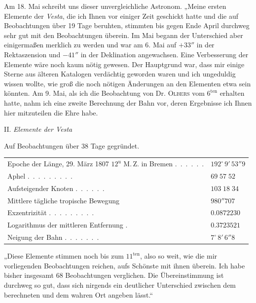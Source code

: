 \par\indent Am 18. Mai schreibt uns dieser unvergleichliche Astronom. „Meine ersten Elemente der \emph{Vesta}, die ich Ihnen vor einiger Zeit geschickt hatte und die auf Beobachtungen über 19 Tage beruhten, stimmten bis gegen Ende April durchweg sehr gut mit den Beobachtungen überein. Im Mai begann der Unterschied aber einigermaßen merklich zu werden und war am 6. Mai auf $+33''$ in der Rektaszension und $-41''$ in der Deklination angewachsen. Eine Verbesserung der Elemente wäre noch kaum nötig gewesen. Der Hauptgrund war, dass mir einige Sterne aus älteren Katalogen verdächtig geworden waren und ich ungeduldig wissen wollte, wie groß die noch nötigen Änderungen an den Elementen etwa sein könnten. Am 9. Mai, als ich die Beobachtung von Dr. \textsc{Olbers} vom $6^{\text{ten}}$ erhalten hatte, nahm ich eine zweite Berechnung der Bahn vor, deren Ergebnisse ich Ihnen hier mitzuteilen die Ehre habe.

\begin{center}
II. \emph{Elemente der Vesta}
\end{center}

\begin{center}
Auf Beobachtungen über 38 Tage gegründet.
\end{center}

\begin{center}\begingroup\fontsize{9}{11}\selectfont
\begin{tabular}{ll}
\shortstack[l]{Epoche der Länge, 29. März 1807 $12^{\text{u}}$\\M.\,Z. in Bremen} .\ .\ .\ .\ .\ . & $192^\circ\,9'\,53''9$ \\
Aphel .\ .\ .\ .\ .\ .\ .\ .\ . & $69\;57\;52$ \\
Aufsteigender Knoten .\ .\ .\ .\ .\ . & $103\;18\;34$ \\
Mittlere tägliche tropische Bewegung  & $980''707$ \\
Exzentrizität .\ .\ .\ .\ .\ .\ .\ .\ . & $0.0872230$ \\
Logarithmus der mittleren Entfernung . & $0.3723521$ \\
Neigung der Bahn .\ .\ .\ .\ .\ .\ . & $7^\circ\,8'\,6''8$
\end{tabular}\endgroup\end{center}

\par\indent „Diese Elemente stimmen noch bis zum $11^{\text{ten}}$, also so weit, wie die mir vorliegenden Beobachtungen reichen, aufs Schönste mit ihnen überein. Ich habe bisher insgesamt 68 Beobachtungen verglichen. Die Übereinstimmung ist durchweg so gut, dass sich nirgends ein deutlicher Unterschied zwischen dem berechneten und dem wahren Ort angeben lässt.“

